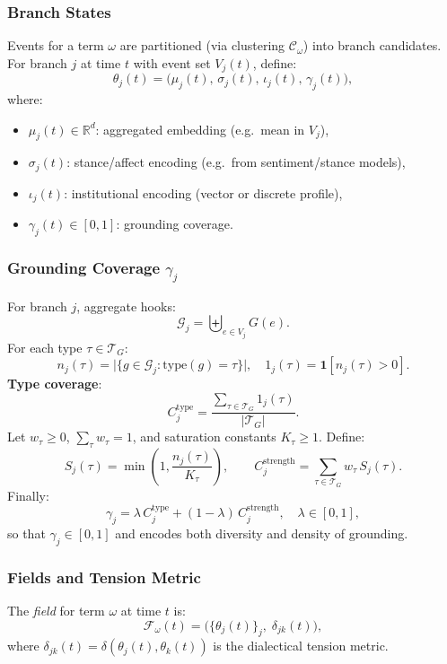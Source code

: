 \documentclass[11pt, a4paper]{article}
\begin{document}
\subsubsection*{Branch States}

Events for a term $\omega$ are partitioned (via clustering $\mathcal{C}_\omega$) into branch candidates.
For branch $j$ at time $t$ with event set $V_j(t)$, define:
\[
\theta_j(t) = \bigl(\mu_j(t),\, \sigma_j(t),\, \iota_j(t),\, \gamma_j(t)\bigr),
\]
where:
\begin{itemize}[nosep]
  \item $\mu_j(t) \in \mathbb{R}^d$: aggregated embedding (e.g.\ mean in $V_j$),
  \item $\sigma_j(t)$: stance/affect encoding (e.g.\ from sentiment/stance models),
  \item $\iota_j(t)$: institutional encoding (vector or discrete profile),
  \item $\gamma_j(t) \in [0,1]$: grounding coverage.
\end{itemize}

\subsubsection*{Grounding Coverage $\gamma_j$}

For branch $j$, aggregate hooks:
\[
\mathcal{G}_j = \biguplus_{e \in V_j} G(e).
\]
For each type $\tau \in \mathcal{T}_G$:
\[
n_j(\tau) = \bigl|\{g \in \mathcal{G}_j : \mathrm{type}(g) = \tau\}\bigr|, \quad
1_j(\tau) = \mathbf{1}[n_j(\tau) > 0].
\]
\textbf{Type coverage}:
\[
C_j^{\mathrm{type}} = \frac{\sum_{\tau \in \mathcal{T}_G} 1_j(\tau)}{|\mathcal{T}_G|}.
\]
Let $w_\tau \ge 0$, $\sum_\tau w_\tau = 1$, and saturation constants $K_\tau \ge 1$.
Define:
\[
S_j(\tau) = \min\!\left(1,\frac{n_j(\tau)}{K_\tau}\right),
\qquad
C_j^{\mathrm{strength}} = \sum_{\tau \in \mathcal{T}_G} w_\tau\, S_j(\tau).
\]
Finally:
\[
\gamma_j = \lambda\, C_j^{\mathrm{type}} + (1-\lambda)\, C_j^{\mathrm{strength}},
\quad \lambda \in [0,1],
\]
so that $\gamma_j \in [0,1]$ and encodes both diversity and density of grounding.

\subsubsection*{Fields and Tension Metric}

The \emph{field} for term $\omega$ at time $t$ is:
\[
\mathcal{F}_\omega(t) = \bigl(\{\theta_j(t)\}_j,\; \delta_{jk}(t)\bigr),
\]
where $\delta_{jk}(t) = \delta(\theta_j(t),\theta_k(t))$ is the dialectical tension metric.
\end{document}
